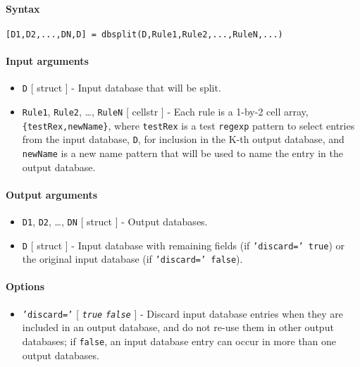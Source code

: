 


	\paragraph{Syntax}

\begin{verbatim}
[D1,D2,...,DN,D] = dbsplit(D,Rule1,Rule2,...,RuleN,...)
\end{verbatim}

\paragraph{Input arguments}

\begin{itemize}
\item
  \texttt{D} {[} struct {]} - Input database that will be split.
\item
  \texttt{Rule1}, \texttt{Rule2}, \ldots{}, \texttt{RuleN} {[} cellstr
  {]} - Each rule is a 1-by-2 cell array, \texttt{\{testRex,newName\}},
  where \texttt{testRex} is a test \texttt{regexp} pattern to select
  entries from the input database, \texttt{D}, for inclusion in the K-th
  output database, and \texttt{newName} is a new name pattern that will
  be used to name the entry in the output database.
\end{itemize}

\paragraph{Output arguments}

\begin{itemize}
\item
  \texttt{D1}, \texttt{D2}, \ldots{}, \texttt{DN} {[} struct {]} -
  Output databases.
\item
  \texttt{D} {[} struct {]} - Input database with remaining fields (if
  \texttt{'discard=' true}) or the original input database (if
  \texttt{'discard=' false}).
\end{itemize}

\paragraph{Options}

\begin{itemize}
\itemsep1pt\parskip0pt
\item
  \texttt{'discard='} {[} \emph{\texttt{true}} \textbar{}
  \emph{\texttt{false}} {]} - Discard input database entries when they
  are included in an output database, and do not re-use them in other
  output databases; if \texttt{false}, an input database entry can occur
  in more than one output databases.
\end{itemize}


